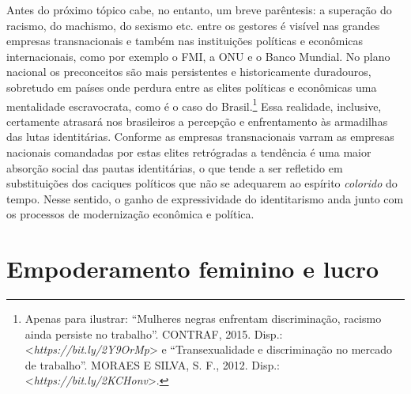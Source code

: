 Antes do próximo tópico cabe, no entanto, um breve parêntesis: a
superação do racismo, do machismo, do sexismo etc. entre os gestores é
visível nas grandes empresas transnacionais e também nas instituições
políticas e econômicas internacionais, como por exemplo o FMI, a ONU e o
Banco Mundial. No plano nacional os preconceitos são mais persistentes e
historicamente duradouros, sobretudo em países onde perdura entre as
elites políticas e econômicas uma mentalidade escravocrata, como é o
caso do Brasil.\footnote{Apenas para ilustrar: ``Mulheres negras
  enfrentam discriminação, racismo ainda persiste no trabalho''.
  CONTRAF, 2015. Disp.:
  \textless{}\emph{https://bit.ly/2Y9OrMp}\textgreater{}
  e ``Transexualidade e discriminação no mercado de trabalho''. MORAES E
  SILVA, S. F., 2012. Disp.:
  \textless{}\emph{https://bit.ly/2KCHonv}\textgreater{}.}
Essa realidade, inclusive, certamente atrasará nos brasileiros a
percepção e enfrentamento às armadilhas das lutas identitárias. Conforme
as empresas transnacionais varram as empresas nacionais comandadas por
estas elites retrógradas a tendência é uma maior absorção social das
pautas identitárias, o que tende a ser refletido em substituições dos
caciques políticos que não se adequarem ao espírito \emph{colorido} do
tempo. Nesse sentido, o ganho de expressividade do identitarismo anda
junto com os processos de modernização econômica e política.

\chapter{Empoderamento feminino e lucro}

